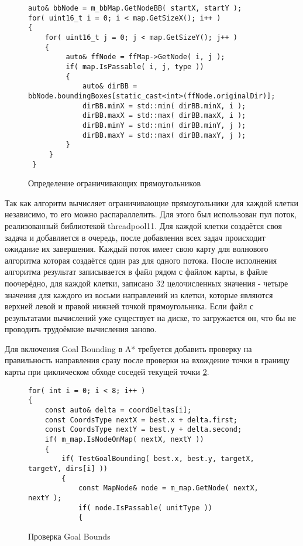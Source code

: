 \begin{figure}[!htb]
	\centering
	\captionsetup{justification=centering}
	\begin{lstlisting}
auto& bbNode = m_bbMap.GetNodeBB( startX, startY );
for( uint16_t i = 0; i < map.GetSizeX(); i++ )
{
	for( uint16_t j = 0; j < map.GetSizeY(); j++ )
	{
		 auto& ffNode = ffMap->GetNode( i, j ); 
		 if( map.IsPassable( i, j, type ))
		 {
			 auto& dirBB = bbNode.boundingBoxes[static_cast<int>(ffNode.originalDir)];	 
			 dirBB.minX = std::min( dirBB.minX, i );
			 dirBB.maxX = std::max( dirBB.maxX, i );
			 dirBB.minY = std::min( dirBB.minY, j );
			 dirBB.maxY = std::max( dirBB.maxY, j );
		 }
	 }
 }
	\end{lstlisting}
	\caption{Определение ограничивающих прямоугольников}
	\label{fig:goal_bounding_fill}
\end{figure}


Так как алгоритм вычисляет ограничивающие прямоугольники для каждой клетки независимо, то его можно распараллелить. Для этого был использован пул поток, реализованный библиотекой threadpool11. Для каждой клетки создаётся своя задача и добавляется в очередь, после добавления всех задач происходит ожидание их завершения. Каждый поток имеет свою карту для волнового алгоритма которая создаётся один раз для одного потока. После исполнения алгоритма результат записывается в файл рядом с файлом карты, в файле поочерёдно, для каждой клетки, записано 32 целочисленных значения - четыре значения для каждого из восьми направлений из клетки, которые являются верхней левой и правой нижней точкой прямоугольника. Если файл с результатами вычислений уже существует на диске, то загружается он, что бы не проводить трудоёмкие вычисления заново.

Для включения Goal Bounding в A* требуется добавить проверку на правильность направления сразу после проверки на вхождение точки в границу карты при циклическом обходе соседей текущей точки \cref{fig:a_star_test_goal_bounds}. 

\begin{figure}[!htb]
	\centering
	\captionsetup{justification=centering}
	\begin{lstlisting}
for( int i = 0; i < 8; i++ )
{
	const auto& delta = coordDeltas[i];
	const CoordsType nextX = best.x + delta.first;
	const CoordsType nextY = best.y + delta.second;
	if( m_map.IsNodeOnMap( nextX, nextY ))
	{
		if( TestGoalBounding( best.x, best.y, targetX, targetY, dirs[i] ))
		{
			const MapNode& node = m_map.GetNode( nextX, nextY );
			if( node.IsPassable( unitType ))
			{
	\end{lstlisting}
	\caption{Проверка Goal Bounds}
	\label{fig:a_star_test_goal_bounds}
\end{figure}

